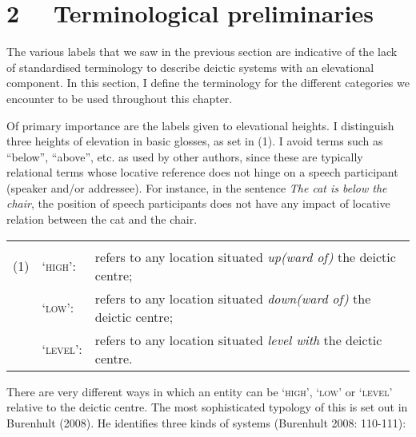 \section[2 \ \ Terminological preliminaries]{2 \ \ Terminological preliminaries}
The various labels that we saw in the previous section are indicative of the lack of standardised terminology to describe deictic systems with an elevational component. In this section, I define the terminology for the different categories we encounter to be used throughout this chapter. 

Of primary importance are the labels given to elevational heights. I distinguish three heights of elevation in basic glosses, as set in (1). I avoid terms such as {\textquotedblleft}below{\textquotedblright}, {\textquotedblleft}above{\textquotedblright}, etc. as used by other authors, since these are typically relational terms whose locative reference does not hinge on a speech participant (speaker and/or addressee). For instance, in the sentence \textit{The cat is below the chair}, the position of speech participants does not have any impact of locative relation between the cat and the chair. 

\begin{flushleft}
\tablehead{}
\begin{supertabular}{m{0.39005986in}m{0.7677598in}m{4.42196in}}
 &
 &
\\
(1) &
{\textquoteleft}\textsc{high}{\textquoteright}: &
refers to any location situated \textit{up(ward of) }the deictic centre;\\
 &
{\textquoteleft}\textsc{low}{\textquoteright}: &
refers to any location situated \textit{down(ward of)} the deictic centre;\\
 &
{\textquoteleft}\textsc{level}{\textquoteright}: &
refers to any location situated \textit{level with }the deictic centre.\\
\end{supertabular}
\end{flushleft}
There are very different ways in which an entity can be {\textquoteleft}\textsc{high}{\textquoteright}, {\textquoteleft}\textsc{low}{\textquoteright} or {\textquoteleft}\textsc{level}{\textquoteright} relative to the deictic centre. The most sophisticated typology of this is set out in Burenhult (2008). He identifies three kinds of systems (Burenhult 2008: 110-111):

